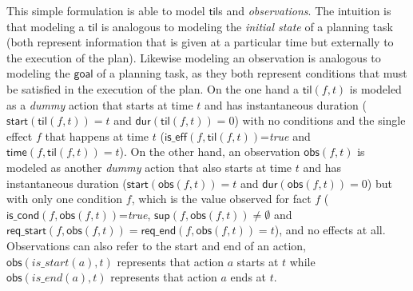 \documentclass{ecai}
\newcommand{\dur}{\mathsf{dur}}    %
\newcommand{\iscond}{\mathsf{is\_cond}}    %
\newcommand{\iseff}{\mathsf{is\_eff}}    %
\newcommand{\obs}{\mathsf{obs}}    %
\newcommand{\start}{\mathsf{start}}%
\newcommand{\til}{\mathsf{til}}    %
\newcommand{\supp}{\mathsf{sup}}   %
\newcommand{\tim}{\mathsf{time}}   %
\newcommand{\reqs}{\mathsf{req\_{start}}} %
\newcommand{\reqe}{\mathsf{req\_{end}}}   %
\newcommand{\goal}{\mathsf{goal}}  %
\begin{document}
This simple formulation is able to model $\til$s and {\em observations}. The intuition is that modeling a $\til$ is analogous to modeling the {\em initial state} of a planning task (both represent information that is given at a particular time but externally to the execution of the plan). Likewise modeling an observation is analogous to modeling the $\goal$ of a planning task, as they both represent conditions that must be satisfied in the execution of the plan. On the one hand a $\til(f,t)$ is modeled as a {\em dummy} action that starts at time $t$ and has instantaneous duration ($\start(\til(f,t))=t$ and $\dur(\til(f,t))=0$) with no conditions and the single effect $f$ that happens at time $t$ ($\iseff(f,\til(f,t))$=\textit{true} and $\tim(f,\til(f,t))=t$). On the other hand, an observation $\obs(f,t)$ is modeled as another {\em dummy} action that also starts at time $t$ and has instantaneous duration ($\start(\obs(f,t))=t$ and $\dur(\obs(f,t))=0$) but with only one condition $f$, which is the value observed for fact $f$ ($\iscond(f,\obs(f,t))$=\textit{true}, $\supp(f,\obs(f,t))\neq \emptyset$ and $\reqs(f,\obs(f,t))=\reqe(f,\obs(f,t))=t$), and no effects at all. Observations can also refer to the start and end of an action, $\obs(is\_start(a),t)$ represents that action $a$ starts at $t$ while $\obs(is\_end(a),t)$ represents that action $a$ ends at $t$.
\end{document}

